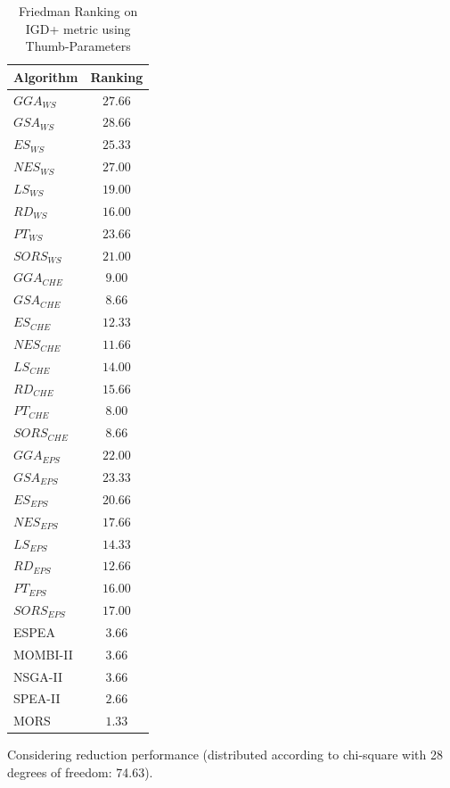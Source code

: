 \par
\begin{table}[!htp]
\centering
\begin{tabular}{lc}
\toprule
Algorithm  & Ranking \\
\midrule
$GGA_{WS}$   & $27.66$  \\
$GSA_{WS}$   & $28.66$  \\
$ES_{WS}$    & $25.33$  \\
$NES_{WS}$   & $27.00$  \\
$LS_{WS}$    & $19.00$  \\
$RD_{WS}$    & $16.00$  \\
$PT_{WS}$    & $23.66$  \\
$SORS_{WS}$  & $21.00$  \\
\midrule
$GGA_{CHE}$  & $9.00$   \\
$GSA_{CHE}$  & $8.66$   \\
$ES_{CHE}$   & $12.33$  \\
$NES_{CHE}$  & $11.66$  \\
$LS_{CHE}$   & $14.00$  \\
$RD_{CHE}$   & $15.66$  \\
$PT_{CHE}$   & $8.00$   \\
$SORS_{CHE}$ & $8.66$   \\
\midrule
$GGA_{EPS}$  & $22.00$  \\
$GSA_{EPS}$  & $23.33$  \\
$ES_{EPS}$   & $20.66$  \\
$NES_{EPS}$  & $17.66$  \\
$LS_{EPS}$   & $14.33$  \\
$RD_{EPS}$   & $12.66$  \\
$PT_{EPS}$   & $16.00$  \\
$SORS_{EPS}$ & $17.00$  \\
\midrule
ESPEA      & $3.66$   \\
MOMBI-II   & $3.66$   \\
NSGA-II    & $3.66$   \\
SPEA-II    & $2.66$   \\
MORS       & $1.33$   \\
\bottomrule
\end{tabular}
\caption{Friedman Ranking on IGD+ metric using Thumb-Parameters}
\label{tab:fried_igd+_thumb}
Considering reduction performance (distributed according to chi-square with 28 degrees of freedom: 74.63).
\end{table}

